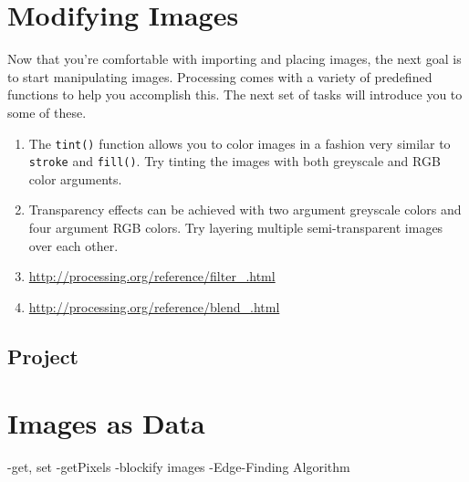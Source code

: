 \documentclass[11pt]{article}
\begin{document}
\section{Modifying Images}
Now that you're comfortable with importing and placing images, the next goal is to start manipulating images.  Processing comes with a variety of predefined functions to help you accomplish this.  The next set of tasks will introduce you to some of these.

\begin{enumerate}
\item The {\tt tint()} function allows you to color images in a fashion very similar to {\tt stroke} and {\tt fill()}.  Try tinting the images with both greyscale and RGB color arguments.
\item Transparency effects can be achieved with two argument greyscale colors and four argument RGB colors.  Try layering multiple semi-transparent images over each other.
\item \url{http://processing.org/reference/filter_.html}
\item \url{http://processing.org/reference/blend_.html}
\end{enumerate}

\subsection*{Project}

\section{Images as Data}
-get, set
-getPixels
-blockify images
-Edge-Finding Algorithm
\end{document}
